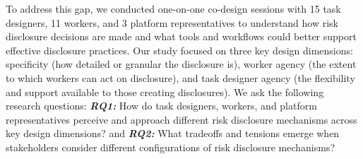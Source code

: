 To address this gap, we conducted one-on-one co-design sessions \cite{tang2024ai,kuo2023understanding} with 15 task designers, 11 workers, and 3 platform representatives to understand how risk disclosure decisions are made and what tools and workflows could better support effective disclosure practices. Our study focused on three key design dimensions: specificity (how detailed or granular the disclosure is), worker agency (the extent to which workers can act on disclosure), and task designer agency (the flexibility and support available to those creating disclosures). We ask the following research questions:\textbf{\textit{ RQ1:}} How do task designers, workers, and platform representatives perceive and approach different risk disclosure mechanisms across key design dimensions? and \textbf{\textit{RQ2: }}What tradeoffs and tensions emerge when stakeholders consider different configurations of risk disclosure mechanisms?  




